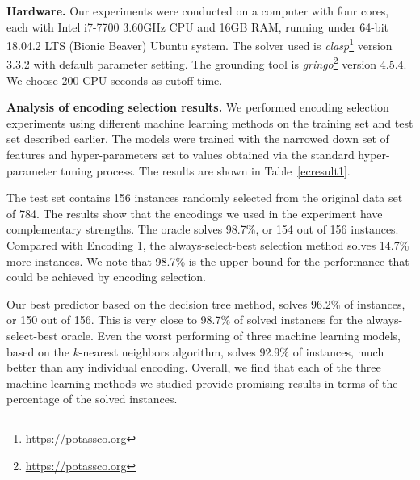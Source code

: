 \documentclass[submission,copyright,creativecommons]{eptcs}
\begin{document}
\textbf{Hardware.}
Our experiments were conducted on a computer with four cores, each with
Intel i7-7700 3.60GHz CPU and 16GB RAM, running under 64-bit 18.04.2 LTS 
(Bionic Beaver) Ubuntu system. The solver used is 
\emph{clasp}\footnote{\url{https://potassco.org}} version
3.3.2 with default parameter setting. The grounding tool 
is \emph{gringo}\footnote{\url{https://potassco.org}} version 4.5.4. We choose 
200 CPU seconds as 
cutoff time.

\smallskip
\noindent
\textbf{Analysis of encoding selection results.}
We performed encoding selection experiments using different machine learning 
methods on the training set and test set described earlier. The models were
trained with the narrowed down set of features and hyper-parameters set to
values obtained via the standard hyper-parameter tuning process.
The results are shown in Table~\ref{ecresult1}. 

The test set contains 156 instances randomly selected from the original 
data set of 784. The results show that 
the encodings we used in the experiment have complementary strengths. The oracle solves 98.7\%, or 154 out of 156 instances.
Compared with Encoding 1, the 
always-select-best selection method solves 14.7\% more instances. 
We note that 98.7\% is the upper bound for the performance that could 
be achieved by encoding selection.

Our best predictor based on the decision tree method, solves 96.2\% of 
instances, or 150 out of 156. This is very close to 98.7\% of solved
instances for the always-select-best oracle. Even the worst performing of 
three machine learning models, based on the $k$-nearest neighbors algorithm,
solves 92.9\% of instances, much better than any individual encoding. Overall, we 
find that each of the three machine learning methods we studied provide 
promising results in terms of the percentage of the solved instances.
\end{document}

